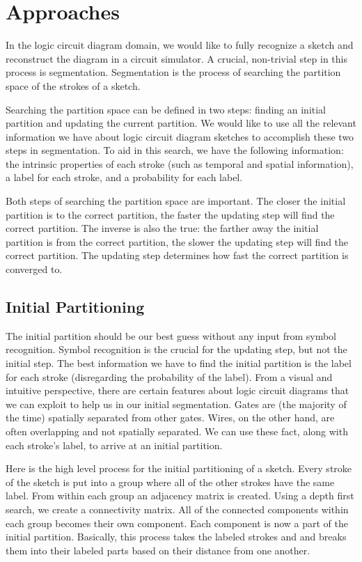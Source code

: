 \documentclass[10pt]{acmsiggraph}               %
\begin{document}
\section{Approaches}
In the logic circuit diagram domain, we would like to fully recognize a sketch and reconstruct the diagram in a circuit simulator.
A crucial, non-trivial step in this process is segmentation.
Segmentation is the process of searching the partition space of the strokes of a sketch.

Searching the partition space can be defined in two steps: finding an initial partition and updating the current partition.
We would like to use all the relevant information we have about logic circuit diagram sketches to accomplish these two steps in segmentation.
To aid in this search, we have the following information: the intrinsic properties of each stroke (such as temporal and spatial information), a label for each stroke, and a probability for each label.

Both steps of searching the partition space are important. 
The closer the initial partition is to the correct partition, the faster the updating step will find the correct partition.
The inverse is also the true: the farther away the initial partition is from the correct partition, the slower the updating step will find the correct partition.
The updating step determines how fast the correct partition is converged to.

\subsection{Initial Partitioning}
The initial partition should be our best guess without any input from symbol recognition.
Symbol recognition is the crucial for the updating step, but not the initial step.
The best information we have to find the initial partition is the label for each stroke (disregarding the probability of the label).
From a visual and intuitive perspective, there are certain features about logic circuit diagrams that we can exploit to help us in our initial segmentation.
Gates are (the majority of the time) spatially separated from other gates.
Wires, on the other hand, are often overlapping and not spatially separated.
We can use these fact, along with each stroke's label, to arrive at an initial partition.

Here is the high level process for the initial partitioning of a sketch. 
Every stroke of the sketch is put into a group where all of the other strokes have the same label.
From within each group an adjacency matrix is created.
Using a depth first search, we create a connectivity matrix.
All of the connected components within each group becomes their own component.
Each component is now a part of the initial partition.
Basically, this process takes the labeled strokes and and breaks them into their labeled parts based on their distance from one another.
\end{document}
